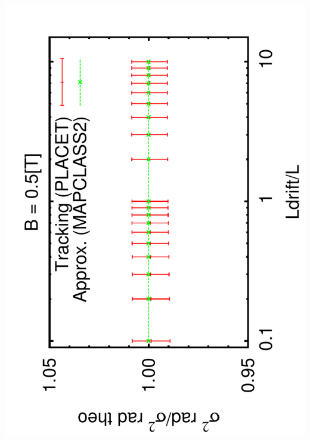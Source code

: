 \documentclass{beamer}
\begin{document}
\begin{frame}
 \includegraphics[scale=0.24,angle=-90]{sigma_Ldrift_r6.pdf}
\end{frame}

\newcommand{\twisslogo}{
  \setlength{\TPHorizModule}{1pt}
  \setlength{\TPVertModule}{1pt}
  \begin{textblock}{1}(200,80)
   Twiss
  \end{textblock}
  }

  \newcommand{\ptctwisslogo}{
  \setlength{\TPHorizModule}{1pt}
  \setlength{\TPVertModule}{1pt}
  \begin{textblock}{1}(200,190)
   ptc\_twiss
  \end{textblock}
  }
  
\end{document}
